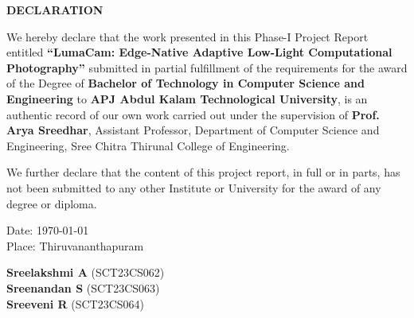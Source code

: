 \newpage
\thispagestyle{empty}

\begin{center}
\textbf{\Large DECLARATION}
\end{center}

\vspace{1.0cm}

\noindent
We hereby declare that the work presented in this Phase-I Project Report entitled \textbf{``LumaCam: Edge-Native Adaptive Low-Light Computational Photography''} submitted in partial fulfillment of the requirements for the award of the Degree of \textbf{Bachelor of Technology in Computer Science and Engineering} to \textbf{APJ Abdul Kalam Technological University}, is an authentic record of our own work carried out under the supervision of \textbf{Prof. Arya Sreedhar}, Assistant Professor, Department of Computer Science and Engineering, Sree Chitra Thirunal College of Engineering.

\vspace{0.8cm}
\noindent
We further declare that the content of this project report, in full or in parts, has not been submitted to any other Institute or University for the award of any degree or diploma.

\vfill

\noindent
\begin{minipage}[b]{0.45\textwidth}
Date: \today \\[0.2cm]
Place: Thiruvananthapuram
\end{minipage}%
\hfill
\begin{minipage}[b]{0.50\textwidth}
\raggedleft
\textbf{Sreelakshmi A} (SCT23CS062) \\[0.3cm]
\textbf{Sreenandan S} (SCT23CS063) \\[0.3cm]
\textbf{Sreeveni R} (SCT23CS064)
\end{minipage}
